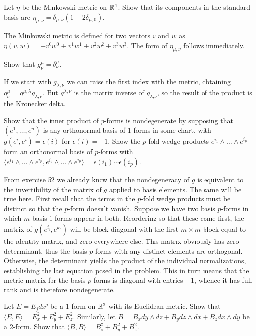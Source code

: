 \begin{p}{Let $\eta$ be the Minkowski metric on $\mathbb{R}^4$. Show that its components in the standard basis
are $\eta_{\mu,\nu}=\delta_{\mu,\nu}(1-2\delta_{\mu,0})$.}\end{p}

The Minkowski metric is defined for two vectors $v$ and $w$ as $\eta(v,w)=-v^0w^0+v^1w^1+v^2w^2+v^3w^3$. The
form of $\eta_{\mu,\nu}$ follows immediately. 

\begin{p}{Show that $g^\mu_\nu=\delta^\mu_\nu$.}\end{p}

If we start with $g_{\lambda,\nu}$ we can raise the first index with the metric, obtaining $g^\mu_\nu=g^{\mu,\lambda}g_{\lambda,\nu}$.
But $g^{\lambda,\nu}$ is the matrix inverse of $g_{\lambda,\nu}$, so the result of the product is the Kronecker delta.

\begin{p}{Show that the inner product of $p$-forms is nondegenerate by supposing that $(e^1,\dots,e^n)$ is any
orthonormal basis of 1-forms in some chart, with $g(e^i,e^i)=\epsilon(i)$ for $\epsilon(i)=\pm 1$. Show the $p$-fold
wedge products $e^{i_1}\wedge\dots\wedge e^{i_p}$ form an orthonormal basis of $p$-forms with 
$\langle e^{i_1} \wedge\dots\wedge e^{i_p},e^{i_1}\wedge\dots\wedge e^{i_p}\rangle=\epsilon(i_1)\cdots\epsilon(i_p)$.}\end{p}

From exercise 52 we already know that the nondegeneracy of $g$ is equivalent to the invertibility of the matrix of $g$ applied to basis 
elements. The same will be true here.  First recall that the terms in
the $p$-fold wedge products must be distinct so that the $p$-form doesn't vanish. 
Suppose we have two basis $p$-forms in which $m$ basis 1-forms
appear in both. Reordering so that these come first, the matrix of $g(e^{i_j},e^{k_\ell})$ will be block diagonal with the first
$m\times m$ block equal to the identity matrix, and zero everywhere else. This matrix obviously has zero determinant, thus
the basis $p$-forms with any distinct elements are orthogonal. Otherwise, the determinant yields the product of the individual
normalizations, establishing the last equation posed in the problem. This in turn means that the metric matrix 
for the basis $p$-forms is diagonal with entries $\pm 1$, whence it has full rank and is therefore nondegenerate.

\begin{p}{Let $E=E_j dx^j$ be a 1-form on $\mathbb{R}^3$ with its Euclidean metric. Show that $\langle E,E\rangle=E_x^2+E_y^2+E_z^2$. Similarly, let $B=B_x dy\wedge dz+B_y dz\wedge dx+B_z dx\wedge dy$ be a 2-form. 
Show that $\langle B,B\rangle = B_x^2+B_y^2+B_z^2$.}\end{p}

